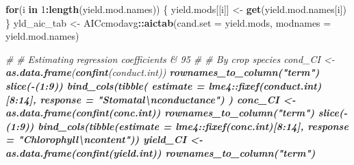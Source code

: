 \documentclass[]{scrartcl}
\newenvironment{Shaded}{\begin{snugshade}}{\end{snugshade}}
\newcommand{\CharTok}[1]{\textcolor[rgb]{0.31,0.60,0.02}{#1}}
\newcommand{\CommentTok}[1]{\textcolor[rgb]{0.56,0.35,0.01}{\textit{#1}}}
\newcommand{\ControlFlowTok}[1]{\textcolor[rgb]{0.13,0.29,0.53}{\textbf{#1}}}
\newcommand{\DataTypeTok}[1]{\textcolor[rgb]{0.13,0.29,0.53}{#1}}
\newcommand{\DecValTok}[1]{\textcolor[rgb]{0.00,0.00,0.81}{#1}}
\newcommand{\KeywordTok}[1]{\textcolor[rgb]{0.13,0.29,0.53}{\textbf{#1}}}
\newcommand{\NormalTok}[1]{#1}
\newcommand{\OperatorTok}[1]{\textcolor[rgb]{0.81,0.36,0.00}{\textbf{#1}}}
\newcommand{\StringTok}[1]{\textcolor[rgb]{0.31,0.60,0.02}{#1}}
\begin{document}
\begin{Shaded}
\begin{Highlighting}[]
{{{{{{{{{{{{    \ControlFlowTok{for}\NormalTok{(i }\ControlFlowTok{in} \DecValTok{1}\OperatorTok{:}\KeywordTok{length}\NormalTok{(yield.mod.names)) \{}
\NormalTok{      yield.mods[[i]] <-}\StringTok{ }\KeywordTok{get}\NormalTok{(yield.mod.names[i]) \}}
\NormalTok{    yld_aic_tab <-}\StringTok{ }\NormalTok{AICcmodavg}\OperatorTok{::}\KeywordTok{aictab}\NormalTok{(}\DataTypeTok{cand.set =}\NormalTok{ yield.mods, }
                                      \DataTypeTok{modnames =}\NormalTok{ yield.mod.names)}

\CommentTok{#}
\CommentTok{# Estimating regression coefficients & 95%
\CommentTok{#}
\CommentTok{# By crop species }
\NormalTok{  cond_CI <-}\StringTok{ }\KeywordTok{as.data.frame}\NormalTok{(}\KeywordTok{confint}\NormalTok{(conduct.int)) }\OperatorTok{%
\StringTok{                      }\KeywordTok{rownames_to_column}\NormalTok{(}\StringTok{"term"}\NormalTok{) }\OperatorTok{%
\StringTok{                        }\KeywordTok{slice}\NormalTok{(}\OperatorTok{-}\NormalTok{(}\DecValTok{1}\OperatorTok{:}\DecValTok{9}\NormalTok{)) }\OperatorTok{%
\StringTok{                    }\KeywordTok{bind_cols}\NormalTok{(}\KeywordTok{tibble}\NormalTok{(}
                                \DataTypeTok{estimate =}\NormalTok{ lme4}\OperatorTok{::}\KeywordTok{fixef}\NormalTok{(conduct.int)[}\DecValTok{8}\OperatorTok{:}\DecValTok{14}\NormalTok{], }
                                \DataTypeTok{response =} \StringTok{"Stomatal}\CharTok{\textbackslash{}n}\StringTok{conductance"}\NormalTok{) ) }
\NormalTok{  conc_CI <-}\StringTok{ }\KeywordTok{as.data.frame}\NormalTok{(}\KeywordTok{confint}\NormalTok{(conc.int)) }\OperatorTok{%
\StringTok{                      }\KeywordTok{rownames_to_column}\NormalTok{(}\StringTok{"term"}\NormalTok{) }\OperatorTok{%
\StringTok{                        }\KeywordTok{slice}\NormalTok{(}\OperatorTok{-}\NormalTok{(}\DecValTok{1}\OperatorTok{:}\DecValTok{9}\NormalTok{)) }\OperatorTok{%
\StringTok{                 }\KeywordTok{bind_cols}\NormalTok{(}\KeywordTok{tibble}\NormalTok{(}\DataTypeTok{estimate =}\NormalTok{ lme4}\OperatorTok{::}\KeywordTok{fixef}\NormalTok{(conc.int)[}\DecValTok{8}\OperatorTok{:}\DecValTok{14}\NormalTok{], }
                                  \DataTypeTok{response =} \StringTok{"Chlorophyll}\CharTok{\textbackslash{}n}\StringTok{content"}\NormalTok{))}
\NormalTok{  yield_CI <-}\StringTok{ }\KeywordTok{as.data.frame}\NormalTok{(}\KeywordTok{confint}\NormalTok{(yield.int)) }\OperatorTok{%
\StringTok{                      }\KeywordTok{rownames_to_column}\NormalTok{(}\StringTok{"term"}\NormalTok{) }\OperatorTok{%
}}}}}}}}}}}}}}}}}}}}}
\end{Highlighting}
\end{Shaded}
\end{document}
